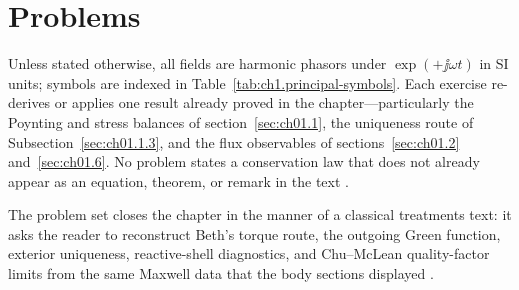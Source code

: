 \section{Problems}
\label{sec:ch01.8}

\noindent Unless stated otherwise, all fields are harmonic phasors under $\exp(+\jj\omega t)$ in SI units; symbols are indexed in Table~\ref{tab:ch1.principal-symbols}. Each exercise re-derives or applies one result already proved in the chapter---particularly the Poynting and stress balances of section~\ref{sec:ch01.1}, the uniqueness route of Subsection~\ref{sec:ch01.1.3}, and the flux observables of sections~\ref{sec:ch01.2} and~\ref{sec:ch01.6}. No problem states a conservation law that does not already appear as an equation, theorem, or remark in the text \cite{stratton1941,harrington2001}.

\noindent The problem set closes the chapter in the manner of a classical treatments text: it asks the reader to reconstruct Beth's torque route, the outgoing Green function, exterior uniqueness, reactive-shell diagnostics, and Chu--McLean quality-factor limits from the same Maxwell data that the body sections displayed \cite{beth1936,chu1948,mcclean1996}.

